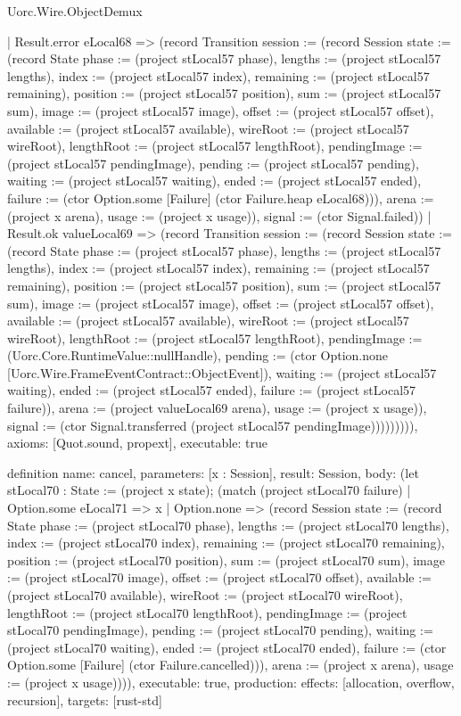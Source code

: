 \begin{lexlean}{Uorc.Wire.ObjectDemux}
\begin{semanticmodule}
{          | Result.error eLocal68 => (record Transition {session := (record Session {state := (record State {phase := (project stLocal57 phase), lengths := (project stLocal57 lengths), index := (project stLocal57 index), remaining := (project stLocal57 remaining), position := (project stLocal57 position), sum := (project stLocal57 sum), image := (project stLocal57 image), offset := (project stLocal57 offset), available := (project stLocal57 available), wireRoot := (project stLocal57 wireRoot), lengthRoot := (project stLocal57 lengthRoot), pendingImage := (project stLocal57 pendingImage), pending := (project stLocal57 pending), waiting := (project stLocal57 waiting), ended := (project stLocal57 ended), failure := (ctor Option.some [Failure] (ctor Failure.heap eLocal68))}), arena := (project x arena), usage := (project x usage)}), signal := (ctor Signal.failed)})
          | Result.ok valueLocal69 => (record Transition {session := (record Session {state := (record State {phase := (project stLocal57 phase), lengths := (project stLocal57 lengths), index := (project stLocal57 index), remaining := (project stLocal57 remaining), position := (project stLocal57 position), sum := (project stLocal57 sum), image := (project stLocal57 image), offset := (project stLocal57 offset), available := (project stLocal57 available), wireRoot := (project stLocal57 wireRoot), lengthRoot := (project stLocal57 lengthRoot), pendingImage := (Uorc.Core.RuntimeValue::nullHandle), pending := (ctor Option.none [Uorc.Wire.FrameEventContract::ObjectEvent]), waiting := (project stLocal57 waiting), ended := (project stLocal57 ended), failure := (project stLocal57 failure)}), arena := (project valueLocal69 arena), usage := (project x usage)}), signal := (ctor Signal.transferred (project stLocal57 pendingImage))}))))))),
  axioms: [Quot.sound, propext],
  executable: true
}

definition{
  name: cancel,
  parameters: [x : Session],
  result: Session,
  body: (let stLocal70 : State := (project x state); (match (project stLocal70 failure)
    | Option.some eLocal71 => x
    | Option.none => (record Session {state := (record State {phase := (project stLocal70 phase), lengths := (project stLocal70 lengths), index := (project stLocal70 index), remaining := (project stLocal70 remaining), position := (project stLocal70 position), sum := (project stLocal70 sum), image := (project stLocal70 image), offset := (project stLocal70 offset), available := (project stLocal70 available), wireRoot := (project stLocal70 wireRoot), lengthRoot := (project stLocal70 lengthRoot), pendingImage := (project stLocal70 pendingImage), pending := (project stLocal70 pending), waiting := (project stLocal70 waiting), ended := (project stLocal70 ended), failure := (ctor Option.some [Failure] (ctor Failure.cancelled))}), arena := (project x arena), usage := (project x usage)}))),
  executable: true,
  production: {effects: [allocation, overflow, recursion], targets: [rust-std]}
}


\end{semanticmodule}
\end{lexlean}
